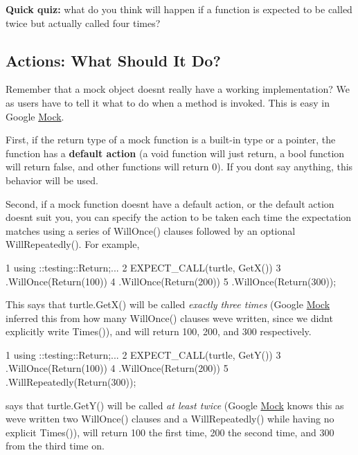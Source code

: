 {\bfseries Quick quiz\+:} what do you think will happen if a function is expected to be called twice but actually called four times?

\subsection*{Actions\+: What Should It Do?}

Remember that a mock object doesn\textquotesingle{}t really have a working implementation? We as users have to tell it what to do when a method is invoked. This is easy in Google \hyperlink{classMock}{Mock}.

First, if the return type of a mock function is a built-\/in type or a pointer, the function has a {\bfseries default action} (a {\ttfamily void} function will just return, a {\ttfamily bool} function will return {\ttfamily false}, and other functions will return 0). If you don\textquotesingle{}t say anything, this behavior will be used.

Second, if a mock function doesn\textquotesingle{}t have a default action, or the default action doesn\textquotesingle{}t suit you, you can specify the action to be taken each time the expectation matches using a series of {\ttfamily Will\+Once()} clauses followed by an optional {\ttfamily Will\+Repeatedly()}. For example,


\begin{DoxyCode}
1 using ::testing::Return;...
2 EXPECT\_CALL(turtle, GetX())
3     .WillOnce(Return(100))
4     .WillOnce(Return(200))
5     .WillOnce(Return(300));
\end{DoxyCode}


This says that {\ttfamily turtle.\+Get\+X()} will be called {\itshape exactly three times} (Google \hyperlink{classMock}{Mock} inferred this from how many {\ttfamily Will\+Once()} clauses we\textquotesingle{}ve written, since we didn\textquotesingle{}t explicitly write {\ttfamily Times()}), and will return 100, 200, and 300 respectively.


\begin{DoxyCode}
1 using ::testing::Return;...
2 EXPECT\_CALL(turtle, GetY())
3     .WillOnce(Return(100))
4     .WillOnce(Return(200))
5     .WillRepeatedly(Return(300));
\end{DoxyCode}


says that {\ttfamily turtle.\+Get\+Y()} will be called {\itshape at least twice} (Google \hyperlink{classMock}{Mock} knows this as we\textquotesingle{}ve written two {\ttfamily Will\+Once()} clauses and a {\ttfamily Will\+Repeatedly()} while having no explicit {\ttfamily Times()}), will return 100 the first time, 200 the second time, and 300 from the third time on.

